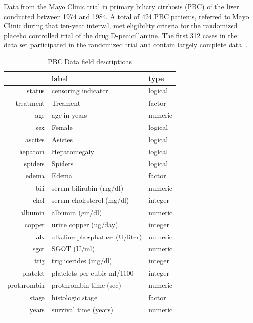 \documentclass[nojss]{jss}
\begin{document}
Data from the Mayo Clinic trial in primary biliary cirrhosis (PBC) of the liver conducted between 1974 and 1984. A total of 424 PBC patients, referred to Mayo Clinic during that ten-year interval, met eligibility criteria for the randomized placebo controlled trial of the drug D-penicillamine. The first 312 cases in the data set participated in the randomized trial and contain largely complete data~\citep{fleming:1991}.



\begin{table}[ht]
\centering
{\footnotesize
\begin{tabular}{rll}
  \toprule
 & label & type \\ 
  \midrule
status & censoring indicator & logical \\ 
   \rowcolor[gray]{0.95}treatment & Treament & factor \\ 
  age & age in years & numeric \\ 
   \rowcolor[gray]{0.95}sex & Female & logical \\ 
  ascites & Asictes & logical \\ 
   \rowcolor[gray]{0.95}hepatom & Hepatomegaly & logical \\ 
  spiders & Spiders & logical \\ 
   \rowcolor[gray]{0.95}edema & Edema & factor \\ 
  bili & serum bilirubin (mg/dl) & numeric \\ 
   \rowcolor[gray]{0.95}chol & serum cholesterol (mg/dl) & integer \\ 
  albumin & albumin (gm/dl) & numeric \\ 
   \rowcolor[gray]{0.95}copper & urine copper (ug/day) & integer \\ 
  alk & alkaline phosphatase (U/liter) & numeric \\ 
   \rowcolor[gray]{0.95}sgot & SGOT (U/ml) & numeric \\ 
  trig & triglicerides (mg/dl) & integer \\ 
   \rowcolor[gray]{0.95}platelet & platelets per cubic ml/1000 & integer \\ 
  prothrombin & prothrombin time (sec) & numeric \\ 
   \rowcolor[gray]{0.95}stage & histologic stage & factor \\ 
  years & survival time (years) & numeric \\ 
   \rowcolor[gray]{0.95} \bottomrule
\end{tabular}
}
\caption{PBC Data field descriptions} 
\label{T:dataLabs}
\end{table}
\end{document}
